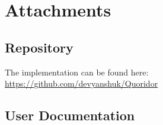 \documentclass[12pt,a4paper]{report}
\begin{document}



\tableofcontents














\printglossaries


\appendix
\chapter{Attachments}

\section{Repository}
\label{app:repository}
The implementation can be found here:  \url{https://github.com/devyanshuk/Quoridor}

\section{User Documentation}
\end{document}
